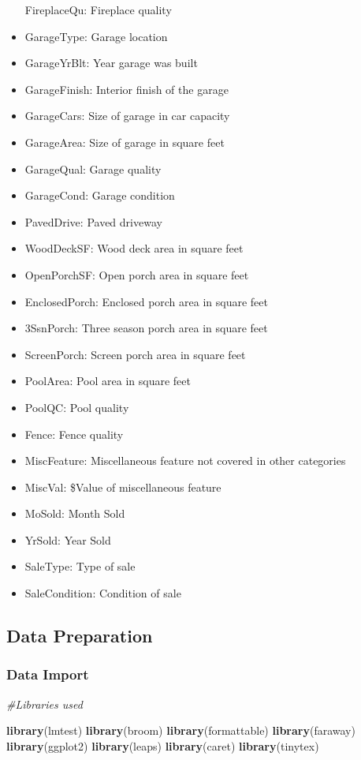 \documentclass[]{article}
\newenvironment{Shaded}{\begin{snugshade}}{\end{snugshade}}
\newcommand{\KeywordTok}[1]{\textcolor[rgb]{0.13,0.29,0.53}{\textbf{#1}}}
\newcommand{\CommentTok}[1]{\textcolor[rgb]{0.56,0.35,0.01}{\textit{#1}}}
\newcommand{\NormalTok}[1]{#1}
\begin{document}
\begin{itemize}
  FireplaceQu: Fireplace quality
\item
  GarageType: Garage location
\item
  GarageYrBlt: Year garage was built
\item
  GarageFinish: Interior finish of the garage
\item
  GarageCars: Size of garage in car capacity
\item
  GarageArea: Size of garage in square feet
\item
  GarageQual: Garage quality
\item
  GarageCond: Garage condition
\item
  PavedDrive: Paved driveway
\item
  WoodDeckSF: Wood deck area in square feet
\item
  OpenPorchSF: Open porch area in square feet
\item
  EnclosedPorch: Enclosed porch area in square feet
\item
  3SsnPorch: Three season porch area in square feet
\item
  ScreenPorch: Screen porch area in square feet
\item
  PoolArea: Pool area in square feet
\item
  PoolQC: Pool quality
\item
  Fence: Fence quality
\item
  MiscFeature: Miscellaneous feature not covered in other categories
\item
  MiscVal: \$Value of miscellaneous feature
\item
  MoSold: Month Sold
\item
  YrSold: Year Sold
\item
  SaleType: Type of sale
\item
  SaleCondition: Condition of sale
\end{itemize}

\subsection{Data Preparation}\label{data-preparation}

\subsubsection{Data Import}\label{data-import}

\begin{Shaded}
\begin{Highlighting}[]
\CommentTok{#Libraries used}

\KeywordTok{library}\NormalTok{(lmtest)}
\KeywordTok{library}\NormalTok{(broom)}
\KeywordTok{library}\NormalTok{(formattable)}
\KeywordTok{library}\NormalTok{(faraway)}
\KeywordTok{library}\NormalTok{(ggplot2)}
\KeywordTok{library}\NormalTok{(leaps)}
\KeywordTok{library}\NormalTok{(caret)}
\KeywordTok{library}\NormalTok{(tinytex)}
\end{Highlighting}
\end{Shaded}
\end{document}
